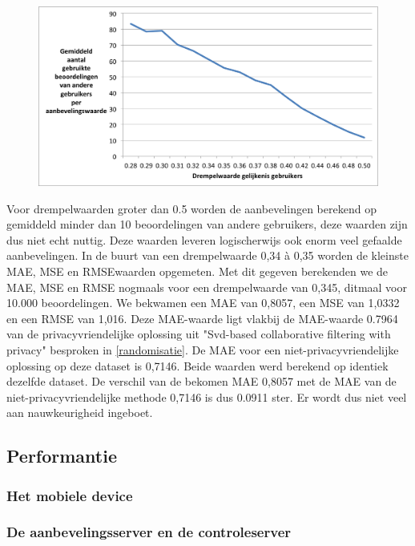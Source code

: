 \begin{figure}[htpb]   
    \label{Figuur::usedratings}      
  \begin{center}    
 \includegraphics[width=\textwidth]{fig/usedratings}    
  \end{center}   
\end{figure}
Voor drempelwaarden groter dan 0.5 worden de aanbevelingen berekend op gemiddeld minder dan 10 beoordelingen van andere gebruikers, deze waarden zijn dus niet echt nuttig. Deze waarden leveren logischerwijs ook enorm veel gefaalde aanbevelingen. In de buurt van een drempelwaarde 0,34 \`a 0,35 worden de kleinste MAE, MSE en RMSEwaarden opgemeten. Met dit gegeven berekenden we de MAE, MSE en RMSE nogmaals voor een drempelwaarde van 0,345, ditmaal voor 10.000 beoordelingen. We bekwamen een MAE van 0,8057, een MSE van 1,0332 en een RMSE van 1,016. Deze MAE-waarde ligt vlakbij de MAE-waarde 0.7964 van de privacyvriendelijke oplossing uit "Svd-based collaborative filtering with privacy\cite{Polat:2005:SCF:1066677.1066860}" besproken in \ref{randomisatie}. De MAE voor een niet-privacyvriendelijke oplossing op deze dataset is 0,7146. Beide waarden werd berekend op identiek dezelfde dataset. De verschil van de bekomen MAE 0,8057 met de MAE van de niet-privacyvriendelijke methode 0,7146 is dus 0.0911 ster. Er wordt dus niet veel aan nauwkeurigheid ingeboet.
\subsection{Performantie}
\subsubsection{Het mobiele device}

\subsubsection{De aanbevelingsserver en de controleserver}